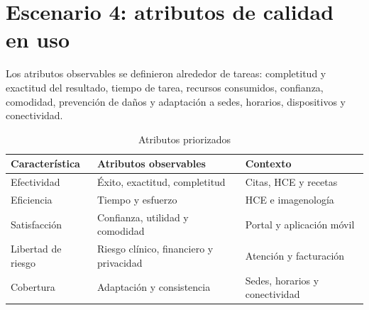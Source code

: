 \chapter{Escenario 4: atributos de calidad en uso}

Los atributos observables se definieron alrededor de tareas: completitud y exactitud del resultado, tiempo de tarea, recursos consumidos, confianza, comodidad, prevención de daños y adaptación a sedes, horarios, dispositivos y conectividad.

\begin{table}[H]\centering
\caption{Atributos priorizados}
\begin{tabularx}{\textwidth}{lXl}\toprule
Característica & Atributos observables & Contexto\\\midrule
Efectividad & Éxito, exactitud, completitud & Citas, HCE y recetas\\
Eficiencia & Tiempo y esfuerzo & HCE e imagenología\\
Satisfacción & Confianza, utilidad y comodidad & Portal y aplicación móvil\\
Libertad de riesgo & Riesgo clínico, financiero y privacidad & Atención y facturación\\
Cobertura & Adaptación y consistencia & Sedes, horarios y conectividad\\\bottomrule
\end{tabularx}
\end{table}

